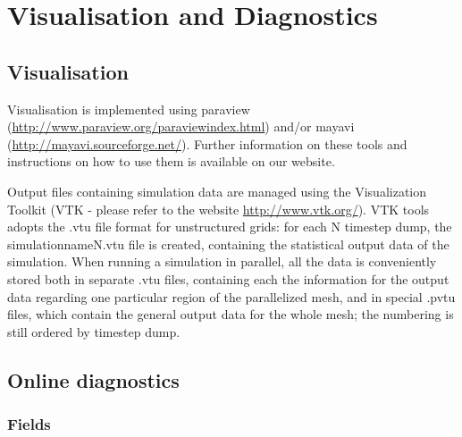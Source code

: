 \chapter{Visualisation and Diagnostics}
\label{chap:visualisation_and_diagnostics}


\section{Visualisation}

\label{sect:mayavi}
\label{sect:paraview}

Visualisation is implemented using paraview (\url{http://www.paraview.org/paraviewindex.html}) and/or mayavi (\url{http://mayavi.sourceforge.net/}).
Further information on these tools and instructions on how to use them is available on our website.

Output files containing simulation data are managed using the Visualization Toolkit (VTK - please refer to the website \url{http://www.vtk.org/}). VTK tools adopts the .vtu file format for unstructured grids: for each N timestep dump, the simulationnameN.vtu file is created, containing the statistical output data of the simulation. When running a simulation in parallel, all the data is conveniently stored both in separate .vtu files, containing each the information for the output data regarding one particular region of the parallelized mesh, and in special .pvtu files, which contain the general output data for the whole mesh; the numbering is still ordered by timestep dump.


\section{Online diagnostics}
\label{sect:online_diagnostics}

\subsection{Fields}
\label{sect:diagnostics_fields}

